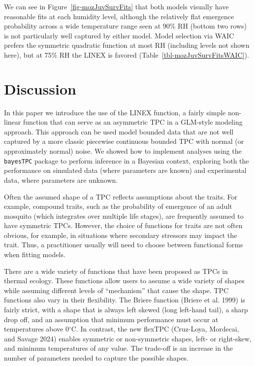\documentclass[
  12pt,
]{article}
\begin{document}
We can see in Figure~\ref{fig-mozJuvSurvFits} that both models visually
have reasonable fits at each humidity level, although the relatively
flat emergence probability across a wide temperature range seen at 90\%
RH (bottom two rows) is not particularly well captured by either model.
Model selection via WAIC prefers the symmetric quadratic function at
most RH (including levels not shown here), but at 75\% RH the LINEX is
favored (Table~\ref{tbl-mozJuvSurvFitsWAIC}).

\section{Discussion}\label{discussion}

In this paper we introduce the use of the LINEX function, a fairly
simple non-linear function that can serve as an asymmetric TPC in a
GLM-style modeling approach. This approach can be used model bounded
data that are not well captured by a more classic piecewise continuous
bounded TPC with normal (or approximately normal) noise. We showed how
to implement analyses using the \texttt{bayesTPC} package to perform
inference in a Bayesian context, exploring both the performance on
simulated data (where parameters are known) and experimental data, where
parameters are unknown.

Often the assumed shape of a TPC reflects assumptions about the traits.
For example, compound traits, such as the probability of emergence of an
adult mosquito (which integrates over multiple life stages), are
frequently assumed to have symmetric TPCs. However, the choice of
functions for traits are not often obvious, for example, in situations
where secondary stressors may impact the trait. Thus, a practitioner
usually will need to choose between functional forms when fitting
models.

There are a wide variety of functions that have been proposed as TPCs in
thermal ecology. These functions allow users to assume a wide variety of
shapes while assuming different levels of ``mechanism'' that cause the
shape. TPC functions also vary in their flexibility. The Briere function
(Briere et al. 1999) is fairly strict, with a shape that is always left
skewed (long left-hand tail), a sharp drop off, and an assumption that
minimum performance must occur at temperatures above 0\(^\circ\)C. In
contrast, the new flexTPC (Cruz-Loya, Mordecai, and Savage 2024) enables
symmetric or non-symmetric shapes, left- or right-skew, and minimum
temperatures of any value. The trade-off is an increase in the number of
parameters needed to capture the possible shapes.
\end{document}
